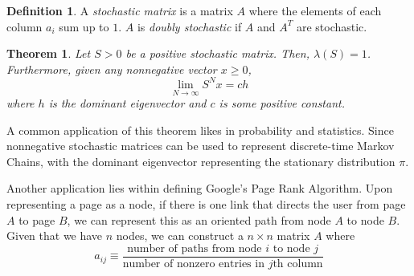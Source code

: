 \documentclass{article}
\newtheorem{theorem}{Theorem}[section]
\theoremstyle{remark}
\theoremstyle{definition}
\newtheorem{definition}{Definition}[section]
\begin{document}
    \begin{definition}
    A \textit{stochastic matrix} is a matrix $A$ where the elements of each column $a_i$ sum up to $1$. $A$ is \textit{doubly stochastic} if $A$ and $A^T$ are stochastic. 
    \end{definition}

    \begin{theorem}
    Let $S > 0$ be a positive stochastic matrix. Then, $\lambda(S) = 1$. Furthermore, given any nonnegative vector $x \geq 0$, 
    \[\lim_{N \rightarrow \infty} S^N x = c h\]
    where $h$ is the dominant eigenvector and $c$ is some positive constant. 
    \end{theorem}

    A common application of this theorem likes in probability and statistics. Since nonnegative stochastic matrices can be used to represent discrete-time Markov Chains, with the dominant eigenvector representing the stationary distribution $\pi$. 

    Another application lies within defining Google's Page Rank Algorithm. Upon representing a page as a node, if there is one link that directs the user from page $A$ to page $B$, we can represent this as an oriented path from node $A$ to node $B$. Given that we have $n$ nodes, we can construct a $n \times n$ matrix $A$ where 
    \[a_{i j} \equiv  \frac{\text{number of paths from node $i$ to node $j$}}{\text{number of nonzero entries in $j$th column}}\]
\end{document}
